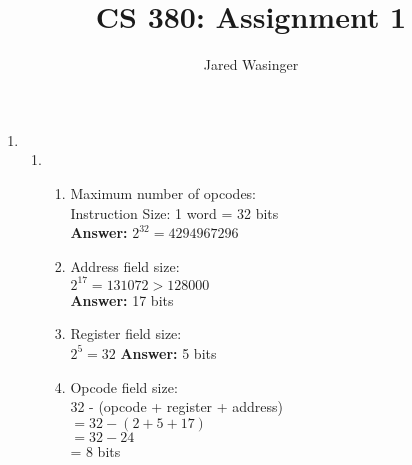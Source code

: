 \documentclass{article}
\begin{document}
  \title{CS 380: Assignment 1}
  \author{Jared Wasinger}

  \maketitle

  \begin{enumerate}
    \item\begin{enumerate}
      \item\begin{enumerate}
        \item Maximum number of opcodes:\\
        Instruction Size: 1 word = 32 bits\\
        \textbf{Answer:} $2^{32}=4294967296$

        \item Address field size:\\
          $2^{17} = 131072 > 128000$\\
          \textbf{Answer:} 17 bits\\
        \item Register field size:\\
          $2^5=32$
          \textbf{Answer:} 5 bits\\
        \item Opcode field size:\\
          32 - (opcode + register + address)\\
          $= 32 - (2 + 5 + 17)$\\ 
          $= 32 - 24$\\
          = 8 bits
        \end{enumerate}


\end{enumerate}
\end{enumerate}
\end{document}
